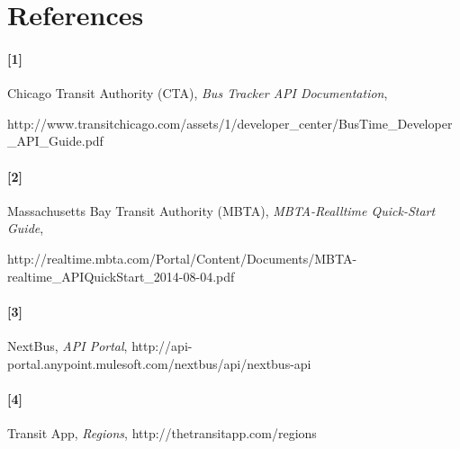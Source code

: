 \documentclass[12pt]{article}
\begin{document}
\section{References}
\paragraph{[1]} Chicago Transit Authority (CTA), \textit{Bus Tracker API Documentation},

http://www.transitchicago.com/assets/1/developer\_center/BusTime\_Developer\_API\_Guide.pdf

\paragraph{[2]} Massachusetts Bay Transit Authority (MBTA), \textit{MBTA-Realltime Quick-Start Guide},

http://realtime.mbta.com/Portal/Content/Documents/MBTA-realtime\_APIQuickStart\_2014-08-04.pdf

\paragraph{[3]} NextBus, \textit{API Portal}, http://api-portal.anypoint.mulesoft.com/nextbus/api/nextbus-api

\paragraph{[4]} Transit App, \textit{Regions}, http://thetransitapp.com/regions
\end{document}

